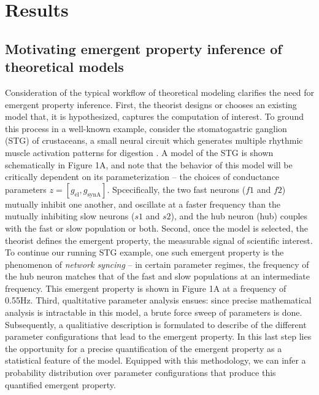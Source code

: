 \documentclass[11pt]{article}
\begin{document}
\section{Results}

\subsection{Motivating emergent property inference of theoretical models} \label{results_motivating}

Consideration of the typical workflow of theoretical modeling clarifies the need for emergent property inference.  
First, the theorist designs or chooses an existing model that, it is hypothesized, captures the computation of interest. 
 To ground this process in a well-known example, consider the stomatogastric ganglion (STG) of crustaceans, a small neural circuit which generates multiple rhythmic muscle activation patterns for digestion \cite{marder2002cellular}.  
 A model of the STG \cite{gutierrez2013multiple} is shown schematically in Figure 1A, and note that the behavior of this model will be critically dependent on its parameterization -- the choices of conductance parameters $z = [g_{\text{el}}, g_{\text{synA}}]$.
Spcecifically, the two fast neurons ($f1$ and $f2$) mutually inhibit one another, and oscillate at a faster frequency than the mutually inhibiting slow neurons ($s1$ and $s2$), and the hub neuron (hub) couples with the fast or slow population or both.  Second, once the model is selected, the theorist defines the emergent property, the measurable signal of scientific interest.  
To continue our running STG example, one such emergent property is the phenomenon of \emph{network syncing} -- in certain parameter regimes, the frequency of the hub neuron matches that of the fast and slow populations at an intermediate frequency.  This emergent property is shown in Figure 1A at a frequency of 0.55Hz.
Third, qualtitative parameter analysis ensues: since precise mathematical analysis is intractable in this model, a brute force sweep of parameters is done.  Subsequently, a qualitiative description is formulated to describe of the different parameter configurations that lead to the emergent property.  
In this last step lies the opportunity for a precise quantification of the emergent property as a statistical feature of the model.  Equipped with this methodology, we can infer a probability distribution over parameter configurations that produce this quantified emergent property. 
\end{document}
